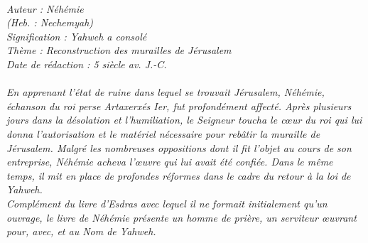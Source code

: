 \BFont
\noindent\hrulefill
{\footnotesize
\textit{
\bigskip
{\centering{}
\\Auteur : Néhémie
\\(Heb. : Nechemyah)
\\Signification : Yahweh a consolé
\\Thème : Reconstruction des murailles de Jérusalem
\\Date de rédaction : 5 siècle av. J.-C.\\}
}
\textit{
\\En apprenant l'état de ruine dans lequel se trouvait Jérusalem, Néhémie, échanson du roi perse Artaxerxés Ier, fut profondément affecté. Après plusieurs jours dans la désolation et l'humiliation, le Seigneur toucha le cœur du roi qui lui donna l'autorisation et le matériel nécessaire pour rebâtir la muraille de Jérusalem. Malgré les nombreuses oppositions dont il fit l'objet au cours de son entreprise, Néhémie acheva l'œuvre qui lui avait été confiée. Dans le même temps, il mit en place de profondes réformes dans le cadre du retour à la loi de Yahweh.
\\Complément du livre d'Esdras avec lequel il ne formait initialement qu'un ouvrage, le livre de Néhémie présente un homme de prière, un serviteur œuvrant pour, avec, et au Nom de Yahweh.\bigskip
}
}
\par\nobreak\noindent\hrulefill
